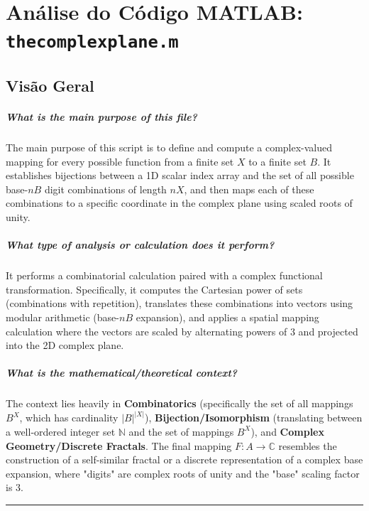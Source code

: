 
\chapter{Análise do Código MATLAB: \texttt{thecomplexplane.m}}
\section{Visão Geral}

\paragraph{What is the main purpose of this file?}
The main purpose of this script is to define and compute a complex-valued mapping for every possible function from a finite set $X$ to a finite set $B$. It establishes bijections between a 1D scalar index array and the set of all possible base-$nB$ digit combinations of length $nX$, and then maps each of these combinations to a specific coordinate in the complex plane using scaled roots of unity.

\paragraph{What type of analysis or calculation does it perform?}
It performs a combinatorial calculation paired with a complex functional transformation. Specifically, it computes the Cartesian power of sets (combinations with repetition), translates these combinations into vectors using modular arithmetic (base-$nB$ expansion), and applies a spatial mapping calculation where the vectors are scaled by alternating powers of 3 and projected into the 2D complex plane.

\paragraph{What is the mathematical/theoretical context?}
The context lies heavily in \textbf{Combinatorics} (specifically the set of all mappings $B^X$, which has cardinality $|B|^{|X|}$), \textbf{Bijection/Isomorphism} (translating between a well-ordered integer set $\mathbb{N}$ and the set of mappings $B^X$), and \textbf{Complex Geometry/Discrete Fractals}. The final mapping $F: A \to \mathbb{C}$ resembles the construction of a self-similar fractal or a discrete representation of a complex base expansion, where "digits" are complex roots of unity and the "base" scaling factor is 3.

\vspace{0.5cm}
\hrule
\vspace{0.5cm}

